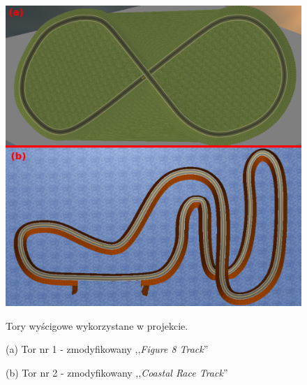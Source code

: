 \clearpage
\begin{figure}[h]
\begin{center}
\includegraphics[width=14.5cm]{resources/figures/race_tracks_marked.png}
\caption{Tory wyścigowe wykorzystane w projekcie.}
\vspace*{-0.3cm}
\caption*{(a) Tor nr 1 - zmodyfikowany ,,\textit{Figure 8 Track}''}
\vspace*{-0.3cm}
\caption*{(b) Tor nr 2 - zmodyfikowany ,,\textit{Coastal Race Track}''}
\label{RaceTracksFig}
\end{center}
\end{figure}

